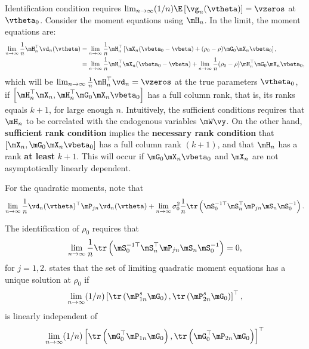 \documentclass[english,12pt]{book}\usepackage[]{graphicx}\usepackage[]{xcolor}
\begin{document}
Identification condition requires $\lim_{n\to\infty}(1/n)\E\left[\vg_n(\vtheta)\right] = \vzeros$ at $\vtheta_0$. Consider the moment equations using $\mH_n$. In the limit, the moment equations are:
\begin{equation*}
\begin{aligned}
\lim_{n\to\infty}\frac{1}{n}\mH_n^\top\vd_n(\vtheta) & = \lim_{n\to\infty}\frac{1}{n}\mH_n^\top\left[\mX_n(\vbeta_0 - \vbeta) + (\rho_0 - \rho)\mG_0\mX_n\vbeta_0\right], \\
& = \lim_{n\to\infty}\frac{1}{n}\mH_n^\top\mX_n(\vbeta_0 - \vbeta) + \lim_{n\to\infty}\frac{1}{n}(\rho_0 - \rho)\mH_n^\top\mG_0\mX_n\vbeta_0, \\
\end{aligned}
\end{equation*}
%
which will be $\lim_{n\to\infty}\frac{1}{n}\mH_n^\top\vd_n = \vzeros$ at the true parameters $\vtheta_0$, if $\left[\mH_n^\top\mX_n, \mH_n^\top\mG_0\mX_n\vbeta_0\right]$ has a full column rank, that is, its ranks equals $k + 1$, for large enough $n$. Intuitively, the sufficient conditions requires that $\mH_n$ to be correlated with the endogenous variables $\mW\vy$. On the other hand,  \textbf{sufficient rank condition} implies the \textbf{necessary rank condition} that $\left[\mX_n, \mG_0\mX_n\vbeta_0\right]$ has a full column rank $(k + 1)$, and that $\mH_n$ has a rank \textbf{at least} $k + 1$. This will occur if $\mG_0\mX_n\vbeta_0$ and $\mX_n$ are not asymptotically linearly dependent. 

For the quadratic moments, note that
\begin{equation*}
  \lim_{n\to\infty}\frac{1}{n}\vd_n(\vtheta)^\top\mP_{jn}\vd_n(\vtheta) + \lim_{n\to\infty}\sigma_0^2\frac{1}{n}\tr\left(\mS_0^{-1\top}\mS_n^\top\mP_{jn}\mS_n\mS_0^{-1}\right).
\end{equation*}

The identification of $\rho_0$ requires that
\begin{equation*}
\lim_{n\to\infty}\frac{1}{n}\tr\left(\mS_0^{-1\top}\mS_n^\top\mP_{jn}\mS_n\mS_0^{-1}\right) = 0,
\end{equation*}
%
for $j= 1, 2$. \cite{lee2007gmm} states that the set of limiting quadratic moment equations has a unique solution at $\rho_0$ if 
\begin{equation*}
      \lim_{n\to\infty}(1/n)\left[\tr\left(\mP_{1n}^s\mG_0\right), \tr\left(\mP_{2n}^s\mG_0\right)\right]^\top, 
    \end{equation*}
    is linearly independent of 
\begin{equation*}
    \begin{aligned}
    \lim_{n\to\infty}(1/n)\left[\tr\left(\mG_0^\top\mP_{1n}\mG_0\right), \tr\left(\mG_0^\top\mP_{2n}\mG_0\right)\right]^\top
    \end{aligned}
\end{equation*}
    
\end{document}
